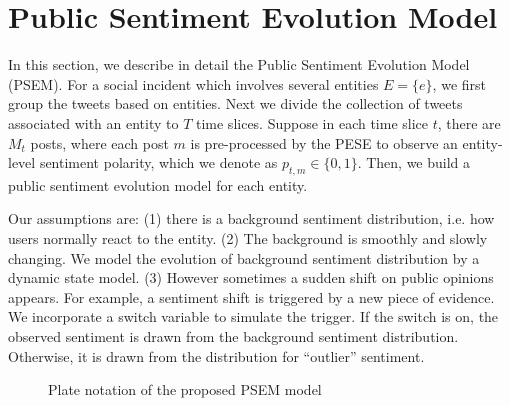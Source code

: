 \documentclass[runningheads]{llncs}
\begin{document}
\section{Public Sentiment Evolution Model}\label{sec:public opinion model}

In this section, we describe in detail the Public Sentiment Evolution Model (PSEM). 
For a social incident which involves several entities $E=\{e\}$, we first group the tweets based on entities. 
Next we divide the collection of tweets associated with an entity to $T$ time slices. 
Suppose in each time slice $t$, there are $M_t$ posts, where each post $m$ is pre-processed by the PESE to observe an entity-level sentiment polarity, which we denote as $p_{t,m}\in \{0,1\}$. 
Then, we build a public sentiment evolution model for each entity.

Our assumptions are: (1) there is a background sentiment distribution, i.e. how users normally react to the entity. 
(2) The background is smoothly and slowly changing. We model the evolution of background sentiment distribution by a dynamic state model.
(3) However sometimes a sudden shift on public opinions appears. For example, a sentiment shift is triggered by a new piece of evidence. We incorporate a switch variable to simulate the trigger. If the switch is on, the observed sentiment is drawn from the background sentiment distribution. Otherwise, it is drawn from the distribution for ``outlier'' sentiment.

\begin{figure}[htp]
  \centering
 \caption{Plate notation of the proposed PSEM model}\label{fig:opinion}
\end{figure}
\end{document}
